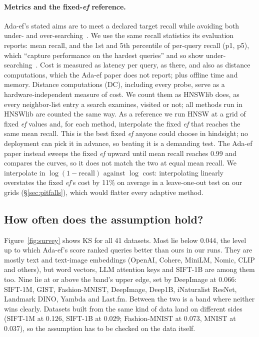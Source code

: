 \documentclass[sigconf,anonymous]{acmart}
\newcommand{\ef}{\textit{ef}}
\begin{document}
\paragraph{Metrics and the fixed-\ef{} reference.}
Ada-ef's stated aims are to meet a declared target recall while avoiding both under- and
over-searching~\cite{zhang2026adaef}. We use the same recall statistics its evaluation reports:
mean recall, and the 1st and 5th percentile of per-query recall (p1, p5), which ``capture
performance on the hardest queries'' and so show under-searching~\cite[\S 7.2]{zhang2026adaef}.
Cost is measured as latency per query, as there, and also as distance computations, which the
Ada-ef paper does not report; plus offline time and memory. Distance
computations (DC), including every probe, serve as a hardware-independent measure of cost. We count
them as HNSWlib does, as every neighbor-list entry a search examines, visited or not; all methods
run in HNSWlib are counted the same way. As a
reference we run HNSW at a grid of fixed \ef{} values and, for each method, interpolate the fixed
\ef{} that reaches the same mean recall. This is the best fixed \ef{} anyone could choose in
hindsight; no deployment can pick it in advance, so beating it is a demanding test. The Ada-ef
paper instead sweeps the fixed \ef{} upward until mean recall reaches 0.99 and compares the curves,
so it does not match the two at equal mean recall. We interpolate in $\log(1 - \text{recall})$ against $\log$ cost:
interpolating linearly overstates the fixed \ef{}'s cost by 11\% on average in a leave-one-out
test on our grids (\S\ref{sec:pitfalls}), which would flatter every adaptive method.

\begin{table}[t]
  \caption{Datasets, sorted by KS (200 queries). $\rho$: rank correlation between each score and
  the true per-query $\mathrm{ef}^*$ on the calibration set, settings P / R; the larger magnitude
  ranks queries better. A dash: the score is constant on the calibration queries.}
  \label{tab:datasets}
  \centering\footnotesize
  \resizebox{\linewidth}{!}{}
\end{table}

\subsection{How often does the assumption hold?}\label{sec:holds}

Figure~\ref{fig:survey} shows KS for all 41 datasets. Most lie below 0.044, the level up to which
Ada-ef's score ranked queries better than ours in our runs. They are mostly text and text-image
embeddings (OpenAI, Cohere, MiniLM, Nomic, CLIP and others), but word vectors, LLM attention keys
and SIFT-1B are among them too. Nine lie at or above the band's upper edge, set by DeepImage at
0.066: SIFT-1M, GIST, Fashion-MNIST, DeepImage, Deep1B, iNaturalist ResNet, Landmark DINO, Yambda
and Last.fm. Between the two is a band where neither wins clearly.
Datasets built from the same kind of data land on different sides (SIFT-1M at 0.126, SIFT-1B at
0.029; Fashion-MNIST at 0.073, MNIST at 0.037), so the assumption has to be checked on the data
itself.
\end{document}
